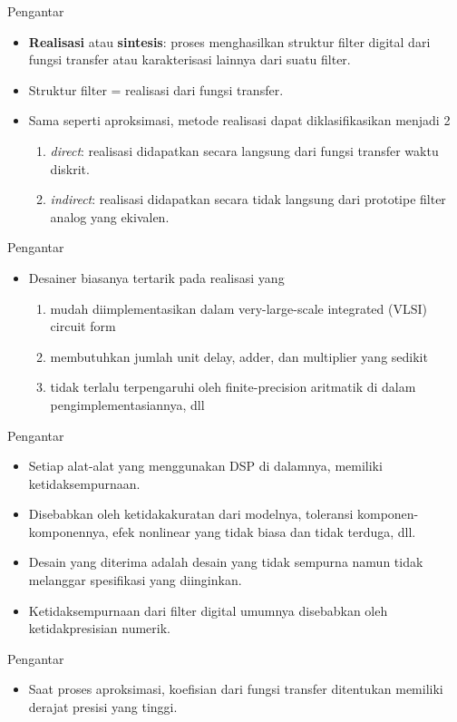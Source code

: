 \documentclass[pdflatex,compress,mathserif]{beamer}
\begin{document}
\begin{frame}{Pengantar}
	\begin{itemize}
		\item \textbf{Realisasi} atau \textbf{sintesis}: proses menghasilkan struktur filter digital dari fungsi transfer atau karakterisasi lainnya dari suatu filter.
		\item Struktur filter = realisasi dari fungsi transfer.
		\item Sama seperti aproksimasi, metode realisasi dapat diklasifikasikan menjadi 2
		\begin{enumerate}
			\item \textit{direct}: realisasi didapatkan secara langsung dari fungsi transfer waktu diskrit.
			\item \textit{indirect}: realisasi didapatkan secara tidak langsung dari prototipe filter analog yang ekivalen.
		\end{enumerate}
	\end{itemize}
\end{frame}

\begin{frame}{Pengantar}
	\begin{itemize}
		\item Desainer biasanya tertarik pada realisasi yang
		\begin{enumerate}
			\item mudah diimplementasikan dalam very-large-scale integrated (VLSI) circuit form
			\item membutuhkan jumlah unit delay, adder, dan multiplier yang sedikit
			\item tidak terlalu terpengaruhi oleh finite-precision aritmatik di dalam pengimplementasiannya, dll
		\end{enumerate}
	\end{itemize}
\end{frame}

\begin{frame}{Pengantar}
	\begin{itemize}
		\item Setiap alat-alat yang menggunakan DSP di dalamnya, memiliki ketidaksempurnaan.
		\item Disebabkan oleh ketidakakuratan dari modelnya, toleransi komponen-komponennya, efek nonlinear yang tidak biasa dan tidak terduga, dll.
		\item Desain yang diterima adalah desain yang tidak sempurna namun tidak melanggar spesifikasi yang diinginkan.
		\item Ketidaksempurnaan dari filter digital umumnya disebabkan oleh ketidakpresisian numerik.
	\end{itemize}
\end{frame}

\begin{frame}{Pengantar}
	\begin{itemize}
		\item Saat proses aproksimasi, koefisian dari fungsi transfer ditentukan memiliki derajat presisi yang tinggi.
	\end{itemize}
\end{frame}
\end{document}
